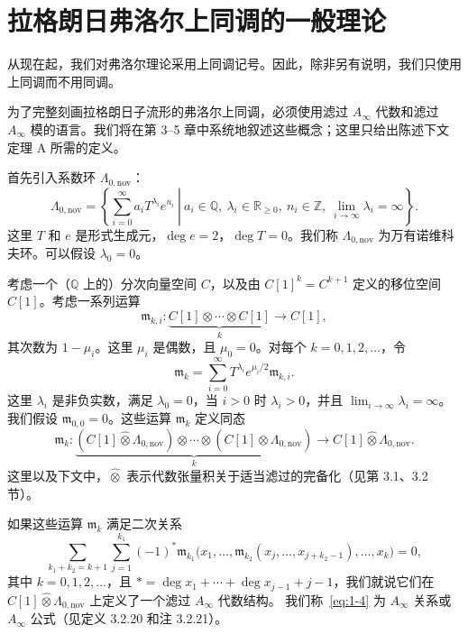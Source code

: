 
\section{拉格朗日弗洛尔上同调的一般理论}
\label{sec:1-2}

从现在起，我们对弗洛尔理论采用上同调记号。因此，除非另有说明，我们只使用上同调而不用同调。

为了完整刻画拉格朗日子流形的弗洛尔上同调，必须使用滤过 $A_\infty$ 代数和滤过
$A_\infty$ 模的语言。我们将在第 3--5 章中系统地叙述这些概念；这里只给出陈述下文定理 A
所需的定义。

首先引入系数环 $\Lambda_{0,\mathrm{nov}}$：
\[
  \Lambda_{0,\mathrm{nov}}
  =\left\{
    \left.
    \sum_{i=0}^{\infty}a_iT^{\lambda_i}e^{n_i}
    \ \right|\ 
    a_i\in\mathbb Q,
    \ \lambda_i\in\mathbb R_{\geq 0},
    \ n_i\in\mathbb Z,
    \ \lim_{i\to\infty}\lambda_i=\infty
  \right\}.
\]
这里 $T$ 和 $e$ 是形式生成元，$\deg e=2$，$\deg T=0$。我们称
$\Lambda_{0,\mathrm{nov}}$ 为万有诺维科夫环。可以假设 $\lambda_0=0$。

考虑一个（$\mathbb Q$ 上的）分次向量空间 $C$，以及由
$C[1]^k=C^{k+1}$ 定义的移位空间 $C[1]$。考虑一系列运算
\[
  \mathfrak m_{k,i}\colon
  \underbrace{C[1]\otimes\cdots\otimes C[1]}_{k}
  \longrightarrow C[1],
\]
其次数为 $1-\mu_i$。这里 $\mu_i$ 是偶数，且 $\mu_0=0$。对每个
$k=0,1,2,\ldots$，令
\[
  \mathfrak m_k=\sum_{i=0}^{\infty}T^{\lambda_i}e^{\mu_i/2}\mathfrak m_{k,i}.
\]
这里 $\lambda_i$ 是非负实数，满足 $\lambda_0=0$，当 $i>0$ 时 $\lambda_i>0$，并且
$\lim_{i\to\infty}\lambda_i=\infty$。我们假设 $\mathfrak m_{0,0}=0$。这些运算
$\mathfrak m_k$ 定义同态
\[
  \mathfrak m_k\colon
  \underbrace{(C[1]\widehat\otimes\Lambda_{0,\mathrm{nov}})
  \otimes\cdots\otimes
  (C[1]\widehat\otimes\Lambda_{0,\mathrm{nov}})}_{k}
  \longrightarrow C[1]\widehat\otimes\Lambda_{0,\mathrm{nov}}.
\]
这里以及下文中，$\widehat\otimes$ 表示代数张量积关于适当滤过的完备化（见第 3.1、3.2 节）。

如果这些运算 $\mathfrak m_k$ 满足二次关系
\begin{equation}
  \sum_{k_1+k_2=k+1}\sum_{j=1}^{k_1}
  (-1)^{*}\mathfrak m_{k_1}
  \bigl(x_1,\ldots,
  \mathfrak m_{k_2}(x_j,\ldots,x_{j+k_2-1}),
  \ldots,x_k\bigr)=0,
  \tag{1.4}\label{eq:1-4}
\end{equation}
其中 $k=0,1,2,\ldots$，且
$*=\deg x_1+\cdots+\deg x_{j-1}+j-1$，我们就说它们在
$C[1]\widehat\otimes\Lambda_{0,\mathrm{nov}}$ 上定义了一个滤过 $A_\infty$ 代数结构。
我们称~\eqref{eq:1-4} 为 $A_\infty$ 关系或 $A_\infty$ 公式\liftIndex{I003}（见定义 3.2.20 和注 3.2.21）。

